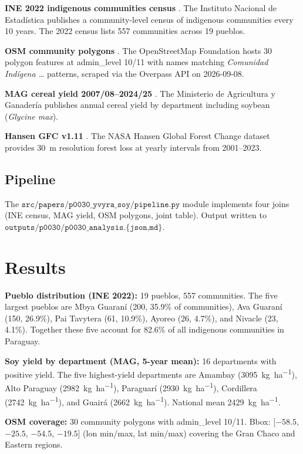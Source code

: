 \textbf{INE 2022 indigenous communities census} \citep{ine2022}.
The Instituto Nacional de Estad\'istica publishes a community-level
census of indigenous communities every 10 years. The 2022 census
lists 557 communities across 19 pueblos.

\textbf{OSM community polygons} \citep{osm2024}. The OpenStreetMap
Foundation hosts 30 polygon features at admin\_level 10/11 with
names matching \textit{Comunidad Ind\'igena \ldots} patterns, scraped
via the Overpass API on 2026-09-08.

\textbf{MAG cereal yield 2007/08--2024/25} \citep{mag2024}. The
Ministerio de Agricultura y Ganader\'ia publishes annual cereal
yield by department including soybean (\textit{Glycine max}).

\textbf{Hansen GFC v1.11} \citep{hansen2013}. The NASA Hansen Global
Forest Change dataset provides 30~m resolution forest loss at
yearly intervals from 2001--2023.

\subsection{Pipeline}

The $\texttt{src/papers/p0030\_yvyra\_soy/pipeline.py}$ module
implements four joins (INE census, MAG yield, OSM polygons, joint
table). Output written to $\texttt{outputs/p0030/p0030\_analysis.\{json,md\}}$.

\section{Results}
\label{sec:yvyra-soy-results}

\textbf{Pueblo distribution (INE 2022):} 19 pueblos, 557 communities.
The five largest pueblos are Mbya Guaran\'i (200, 35.9\% of
communities), Ava Guaran\'i (150, 26.9\%), Pai Tavytera (61, 10.9\%),
Ayoreo (26, 4.7\%), and Nivacle (23, 4.1\%). Together these five
account for 82.6\% of all indigenous communities in Paraguay.

\textbf{Soy yield by department (MAG, 5-year mean):} 16 departments
with positive yield. The five highest-yield departments are
Amambay (\SI{3095}{\kg\per\hectare}), Alto Paraguay
(\SI{2982}{\kg\per\hectare}), Paraguar\'i (\SI{2930}{\kg\per\hectare}),
Cordillera (\SI{2742}{\kg\per\hectare}), and Guair\'a
(\SI{2662}{\kg\per\hectare}). National mean \SI{2429}{\kg\per\hectare}.

\textbf{OSM coverage:} 30 community polygons with admin\_level 10/11.
Bbox: [$-58.5$, $-25.5$, $-54.5$, $-19.5$] (lon min/max, lat min/max)
covering the Gran Chaco and Eastern regions.


